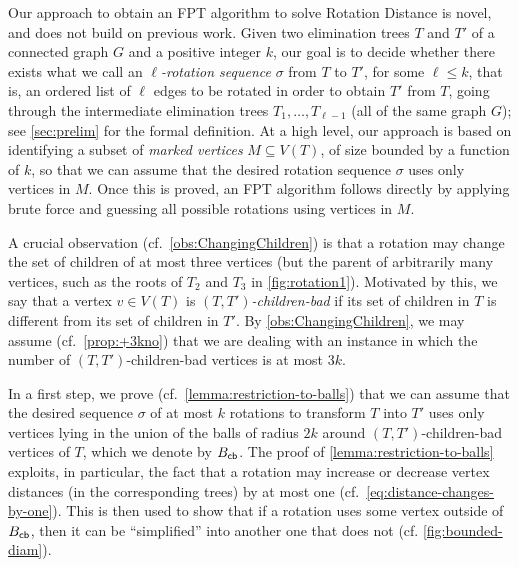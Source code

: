 \documentclass[a4paper,UKenglish,cleveref, autoref, thm-restate]{lipics-v2021}
\newcommand{\Bcb}{B_{\sf cb}\xspace}
\newcommand{\FPT}{{\sf FPT}\xspace}
\newcommand{\kelimination}{{\sc Rotation Distance}\xspace}
\begin{document}
Our approach to obtain an \FPT algorithm to solve \kelimination is novel, and does not build on previous work. Given two elimination trees $T$ and $T'$ of a connected graph $G$ and a positive integer $k$, our goal is to decide whether there exists what we call an   \textit{$\ell$-rotation sequence} $\sigma$ from $T$ to $T'$, for some $\ell \leq k$, that is, an ordered list of $\ell$ edges to be rotated in order to obtain $T'$ from $T$, going through the intermediate elimination trees $T_1, \ldots, T_{\ell-1}$ (all of the same graph $G$); see \autoref{sec:prelim} for the formal definition. At a high level, our approach is based on identifying a subset of \emph{marked vertices} $M \subseteq V(T)$, of size bounded by a function of $k$, so that we can assume that the desired rotation sequence $\sigma$ uses only vertices in $M$. Once this is proved, an \FPT algorithm follows directly by applying brute force and guessing all possible rotations using vertices in $M$.

A crucial observation (cf.~\autoref{obs:ChangingChildren}) is that a rotation may change the set of children of at most three vertices (but the parent of arbitrarily many vertices, such as the roots of $T_2$ and $T_3$ in \autoref{fig:rotation1}). Motivated by this, we say that a vertex $v \in V(T)$ is \emph{$(T,T')$-children-bad} if its set of children in $T$ is different from its set of children in $T'$. By \autoref{obs:ChangingChildren}, we may assume (cf.~\autoref{prop:+3kno}) that we are dealing with an instance in which the number of $(T,T')$-children-bad vertices is at most $3k$.

In a first step, we prove (cf.~\autoref{lemma:restriction-to-balls}) that we can assume that the desired sequence $\sigma$ of at most $k$ rotations to transform $T$ into $T'$ uses only vertices lying in the union of the balls of radius $2k$ around $(T,T')$-children-bad vertices of $T$, which we denote by $\Bcb$. The proof of \autoref{lemma:restriction-to-balls} exploits, in particular, the fact that a rotation may increase or decrease vertex distances (in the corresponding trees) by at most one (cf.~\autoref{eq:distance-changes-by-one}). This is then used to show that if a rotation uses some vertex outside of  $\Bcb$, then it can be ``simplified'' into another one that does not (cf. \autoref{fig:bounded-diam}).
\end{document}
